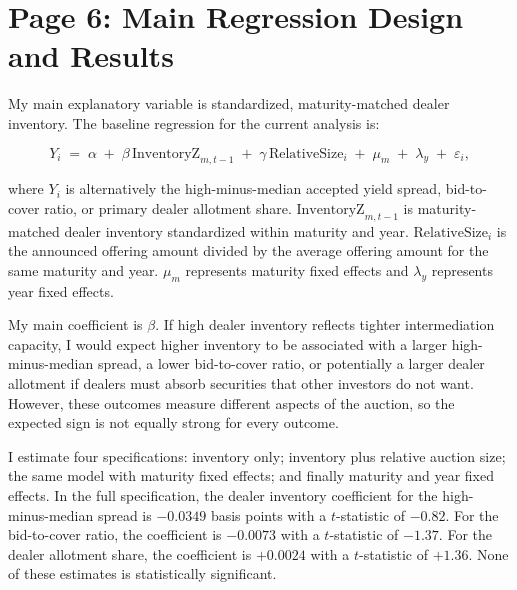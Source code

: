 \documentclass[12pt]{article}
\begin{document}
\newpage
\section{Page 6: Main Regression Design and Results}

My main explanatory variable is standardized, maturity-matched dealer inventory. The baseline regression for the current analysis is:

\begin{equation*}
Y_i \;=\; \alpha \;+\; \beta\,\text{InventoryZ}_{m,t-1} \;+\; \gamma\,\text{RelativeSize}_i \;+\; \mu_m \;+\; \lambda_y \;+\; \varepsilon_i ,
\end{equation*}

where $Y_i$ is alternatively the high-minus-median accepted yield spread, bid-to-cover ratio, or primary dealer allotment share. $\text{InventoryZ}_{m,t-1}$ is maturity-matched dealer inventory standardized within maturity and year. $\text{RelativeSize}_i$ is the announced offering amount divided by the average offering amount for the same maturity and year. $\mu_m$ represents maturity fixed effects and $\lambda_y$ represents year fixed effects.

My main coefficient is $\beta$. If high dealer inventory reflects tighter intermediation capacity, I would expect higher inventory to be associated with a larger high-minus-median spread, a lower bid-to-cover ratio, or potentially a larger dealer allotment if dealers must absorb securities that other investors do not want. However, these outcomes measure different aspects of the auction, so the expected sign is not equally strong for every outcome.

I estimate four specifications: inventory only; inventory plus relative auction size; the same model with maturity fixed effects; and finally maturity and year fixed effects. In the full specification, the dealer inventory coefficient for the high-minus-median spread is $-0.0349$ basis points with a $t$-statistic of $-0.82$. For the bid-to-cover ratio, the coefficient is $-0.0073$ with a $t$-statistic of $-1.37$. For the dealer allotment share, the coefficient is $+0.0024$ with a $t$-statistic of $+1.36$. None of these estimates is statistically significant.
\end{document}
